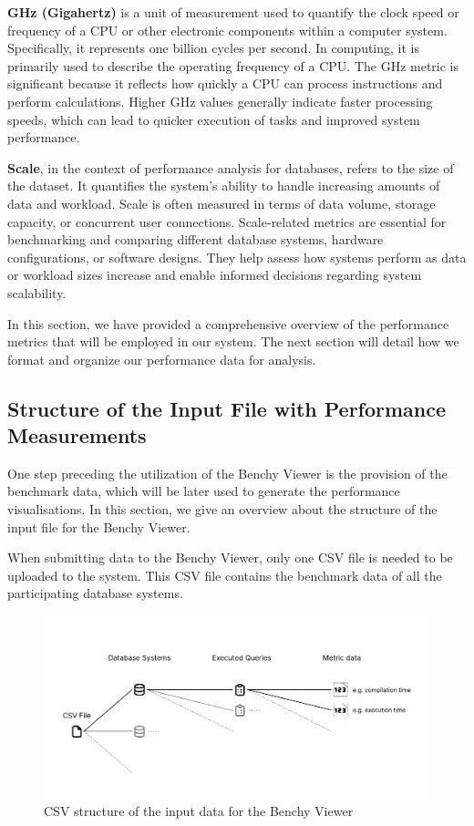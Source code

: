 \textbf{GHz (Gigahertz)} is a unit of measurement used to quantify the clock speed or frequency of a CPU or other electronic components within a computer system. Specifically, it represents one billion cycles per second. In computing, it is primarily used to describe the operating frequency of a CPU. The GHz metric is significant because it reflects how quickly a CPU can process instructions and perform calculations. Higher GHz values generally indicate faster processing speeds, which can lead to quicker execution of tasks and improved system performance.

\textbf{Scale}, in the context of performance analysis for databases, refers to the size of the dataset. It quantifies the system's ability to handle increasing amounts of data and workload. Scale is often measured in terms of data volume, storage capacity, or concurrent user connections. Scale-related metrics are essential for benchmarking and comparing different database systems, hardware configurations, or software designs. They help assess how systems perform as data or workload sizes increase and enable informed decisions regarding system scalability.

In this section, we have provided a comprehensive overview of the performance metrics that will be employed in our system. The next section will detail how we format and organize our performance data for analysis.



\subsection{Structure of the Input File with Performance Measurements}\label{sec:input-file-structure}
One step preceding the utilization of the Benchy Viewer is the provision of the benchmark data, which will be later used to generate the performance visualisations. In this section, we give an overview about the structure of the input file for the Benchy Viewer.

When submitting data to the Benchy Viewer, only one CSV file is needed to be uploaded to the system. This CSV file contains the benchmark data of all the participating database systems.

\begin{figure}[h]
  \centering
  \includegraphics[width=1\linewidth]{figures/csv-structure.pdf}
  \caption{CSV structure of the input data for the Benchy Viewer}
  \label{fig:csv-structure}
\end{figure}

